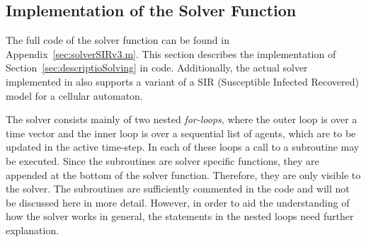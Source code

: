 
\subsection{Implementation of the Solver Function}
\label{sec:implementSolver}

The full code of the solver function can be found in
Appendix~\ref{sec:solverSIRv3.m}.  This section describes the implementation of
Section~\ref{sec:descriptioSolving} in \matlab code.  Additionally, the actual
solver implemented in \matlab also supports a variant of a SIR (Susceptible
Infected Recovered) model for a cellular automaton.

The solver consists mainly of two nested \textsl{for-loops}, where the outer
loop is over a time vector and the inner loop is over a sequential list of
agents, which are to be updated in the active time-step.  In each of these
loops a call to a subroutine may be executed.  Since the subroutines are solver
specific functions, they are appended at the bottom of the solver function.
Therefore, they are only visible to the solver.  The subroutines are
sufficiently commented in the code and will not be discussed here in more
detail.  However, in order to aid the understanding of how the solver works in
general, the statements in the nested loops need further explanation.



